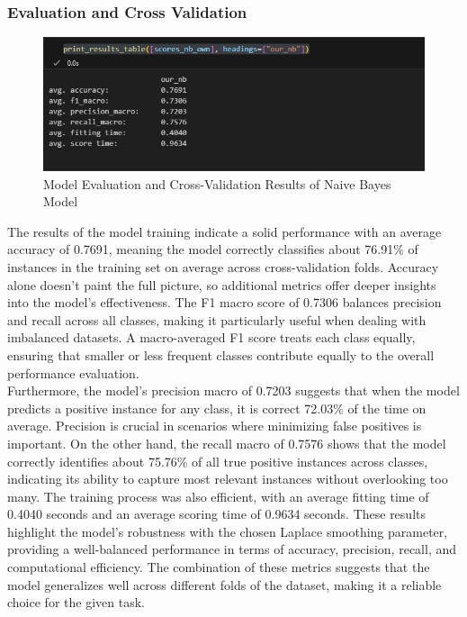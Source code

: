 \subsubsection{Evaluation and Cross Validation}

\begin{figure}[hbt!]
    \centering
    \includegraphics[width=1\linewidth]{Images/6.5a.jpg}
    \caption{Model Evaluation and Cross-Validation Results of Naive Bayes Model}
    \label{fig:enter-label}
\end{figure}

The results of the model training indicate a solid performance with an average accuracy of 0.7691, meaning the model correctly classifies about 76.91\% of instances in the training set on average across cross-validation folds. Accuracy alone doesn’t paint the full picture, so additional metrics offer deeper insights into the model’s effectiveness. The F1 macro score of 0.7306 balances precision and recall across all classes, making it particularly useful when dealing with imbalanced datasets. A macro-averaged F1 score treats each class equally, ensuring that smaller or less frequent classes contribute equally to the overall performance evaluation.\\

Furthermore, the model’s precision macro of 0.7203 suggests that when the model predicts a positive instance for any class, it is correct 72.03\% of the time on average. Precision is crucial in scenarios where minimizing false positives is important. On the other hand, the recall macro of 0.7576 shows that the model correctly identifies about 75.76\% of all true positive instances across classes, indicating its ability to capture most relevant instances without overlooking too many. The training process was also efficient, with an average fitting time of 0.4040 seconds and an average scoring time of 0.9634 seconds. These results highlight the model's robustness with the chosen Laplace smoothing parameter, providing a well-balanced performance in terms of accuracy, precision, recall, and computational efficiency. The combination of these metrics suggests that the model generalizes well across different folds of the dataset, making it a reliable choice for the given task.

